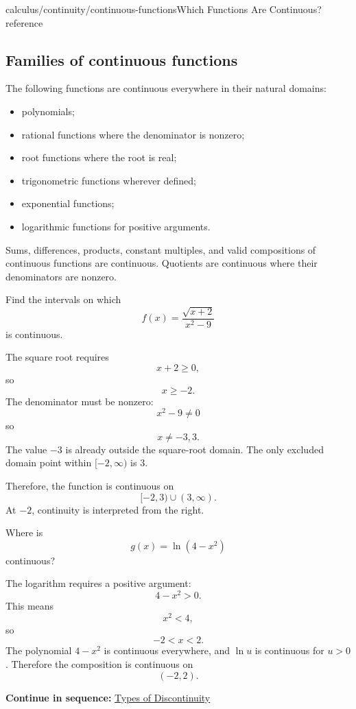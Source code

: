 \documentclass[11pt,openany]{book}
\theoremstyle{bgplain}
\newcounter{bgexample}[chapter]
\newcommand{\webnext}[2]{%
  \par\addvspace{1.2em}\noindent{\color{BGLine}\rule{\textwidth}{0.35pt}}\par\smallskip
  {\small\color{BGGray}\textbf{Continue in sequence:} \hyperlink{web:#1}{#2}}\par
}
\begin{document}
\begin{webpage}{calculus/continuity/continuous-functions}{Which Functions Are Continuous?}{reference}
\subsection{Families of continuous functions}

The following functions are continuous everywhere in their natural domains:

\begin{itemize}
  \item polynomials;
  \item rational functions where the denominator is nonzero;
  \item root functions where the root is real;
  \item trigonometric functions wherever defined;
  \item exponential functions;
  \item logarithmic functions for positive arguments.
\end{itemize}

Sums, differences, products, constant multiples, and valid compositions of continuous functions are continuous. Quotients are continuous where their denominators are nonzero.

\begin{bgexample}[title={Find intervals of continuity}]
Find the intervals on which
\[
  f(x)=\frac{\sqrt{x+2}}{x^2-9}
\]
is continuous.

\begin{bgsolution}
The square root requires
\[
  x+2\ge0,
\]
so
\[
  x\ge-2.
\]
The denominator must be nonzero:
\[
  x^2-9\ne0
\]
so
\[
  x\ne-3,3.
\]
The value \(-3\) is already outside the square-root domain. The only excluded domain point within \([-2,\infty)\) is \(3\).

Therefore, the function is continuous on
\[
  \boxed{[-2,3)\cup(3,\infty)}.
\]
At \(-2\), continuity is interpreted from the right.
\end{bgsolution}
\end{bgexample}

\begin{bgexample}[title={Composition}]
Where is
\[
  g(x)=\ln(4-x^2)
\]
continuous?

\begin{bgsolution}
The logarithm requires a positive argument:
\[
  4-x^2>0.
\]
This means
\[
  x^2<4,
\]
so
\[
  -2<x<2.
\]
The polynomial \(4-x^2\) is continuous everywhere, and \(\ln u\) is continuous for \(u>0\). Therefore the composition is continuous on
\[
  \boxed{(-2,2)}.
\]
\end{bgsolution}
\end{bgexample}
\webnext{calculus/continuity/types-of-discontinuity}{Types of Discontinuity}
\end{webpage}
\end{document}
